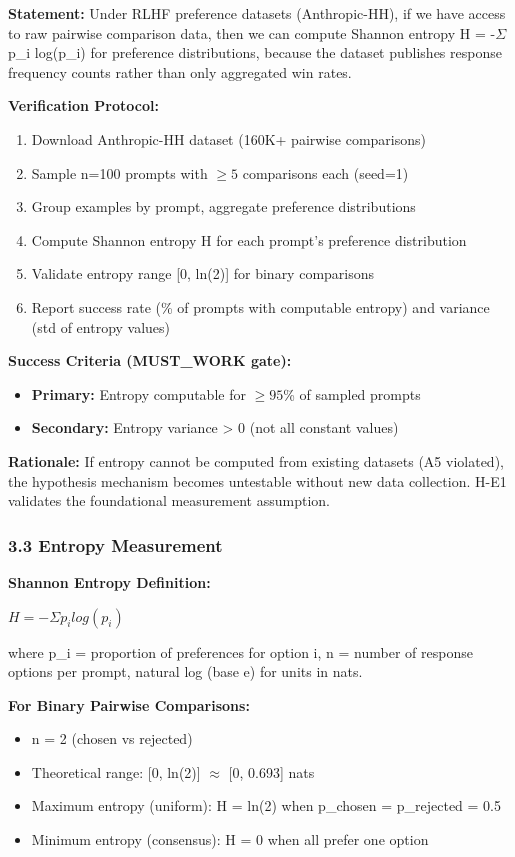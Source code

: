 \textbf{Statement:} Under RLHF preference datasets (Anthropic-HH), if we have access to raw pairwise comparison data, then we can compute Shannon entropy H = -$\Sigma$ p\_i log(p\_i) for preference distributions, because the dataset publishes response frequency counts rather than only aggregated win rates.

\textbf{Verification Protocol:}
\begin{enumerate}
\item Download Anthropic-HH dataset (160K+ pairwise comparisons)
\item Sample n=100 prompts with $\geq 5$ comparisons each (seed=1)
\item Group examples by prompt, aggregate preference distributions
\item Compute Shannon entropy H for each prompt's preference distribution
\item Validate entropy range [0, ln(2)] for binary comparisons
\item Report success rate (\% of prompts with computable entropy) and variance (std of entropy values)
\end{enumerate}

\textbf{Success Criteria (MUST\_WORK gate):}
\begin{itemize}
\item \textbf{Primary:} Entropy computable for $\geq 95$\% of sampled prompts
\item \textbf{Secondary:} Entropy variance > 0 (not all constant values)
\end{itemize}

\textbf{Rationale:} If entropy cannot be computed from existing datasets (A5 violated), the hypothesis mechanism becomes untestable without new data collection. H-E1 validates the foundational measurement assumption.

\subsubsection{3.3 Entropy Measurement}

\textbf{Shannon Entropy Definition:}

$H = -\Sigma p_i log(p_i)$

where p\_i = proportion of preferences for option i, n = number of response options per prompt, natural log (base e) for units in nats.

\textbf{For Binary Pairwise Comparisons:}
\begin{itemize}
\item n = 2 (chosen vs rejected)
\item Theoretical range: [0, ln(2)] $\approx$ [0, 0.693] nats
\item Maximum entropy (uniform): H = ln(2) when p\_chosen = p\_rejected = 0.5
\item Minimum entropy (consensus): H = 0 when all prefer one option
\end{itemize}

